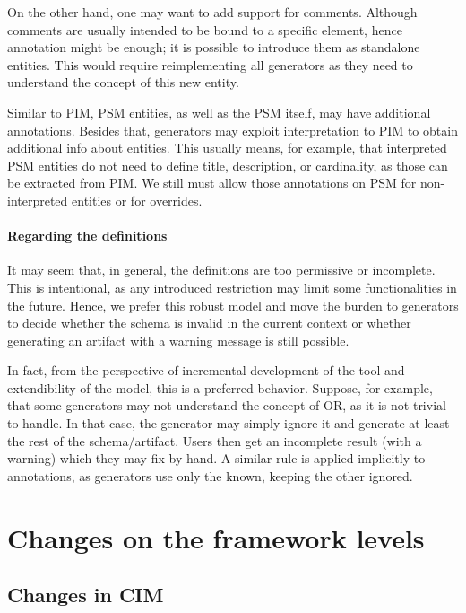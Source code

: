 On the other hand, one may want to add support for comments. Although comments are usually intended to be bound to a specific element, hence annotation might be enough; it is possible to introduce them as standalone entities. This would require reimplementing all generators as they need to understand the concept of this new entity.

\bigskip

Similar to PIM, PSM entities, as well as the PSM itself, may have additional annotations. Besides that, generators may exploit interpretation to PIM to obtain additional info about entities. This usually means, for example, that interpreted PSM entities do not need to define title, description, or cardinality, as those can be extracted from PIM. We still must allow those annotations on PSM for non-interpreted entities or for overrides.


\paragraph{Regarding the definitions} It may seem that, in general, the definitions are too permissive or incomplete. This is intentional, as any introduced restriction may limit some functionalities in the future. Hence, we prefer this robust model and move the burden to generators to decide whether the schema is invalid in the current context or whether generating an artifact with a warning message is still possible.

In fact, from the perspective of incremental development of the tool and extendibility of the model, this is a preferred behavior. Suppose, for example, that some generators may not understand the concept of OR, as it is not trivial to handle. In that case, the generator may simply ignore it and generate at least the rest of the schema/artifact. Users then get an incomplete result (with a warning) which they may fix by hand. A similar rule is applied implicitly to annotations, as generators use only the known, keeping the other ignored.

\section{Changes on the framework levels}

\subsection{Changes in CIM}

